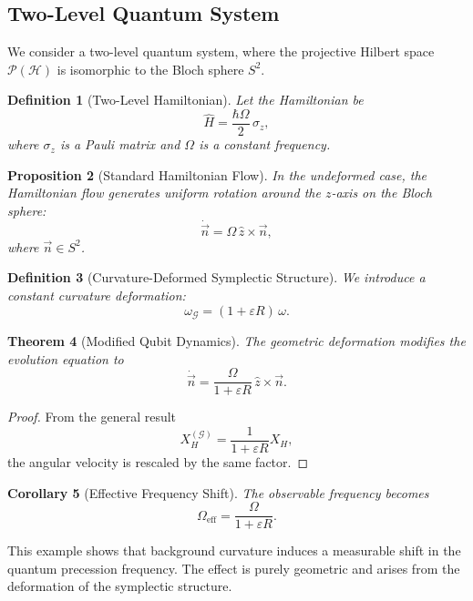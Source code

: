 \documentclass[11pt, a4paper]{article}
\newtheorem{theorem}{Theorem}[section]
\newtheorem{proposition}[theorem]{Proposition}
\newtheorem{definition}[theorem]{Definition}
\newtheorem{corollary}[theorem]{Corollary}
\begin{document}
\subsection{Two-Level Quantum System}

We consider a two-level quantum system, where the projective Hilbert space
$\mathcal{P}(\mathcal{H})$ is isomorphic to the Bloch sphere $S^2$.

\begin{definition}[Two-Level Hamiltonian]
Let the Hamiltonian be
\[
\hat{H} = \frac{\hbar \Omega}{2}\,\sigma_z,
\]
where $\sigma_z$ is a Pauli matrix and $\Omega$ is a constant frequency.
\end{definition}

\begin{proposition}[Standard Hamiltonian Flow]
In the undeformed case, the Hamiltonian flow generates uniform rotation
around the $z$-axis on the Bloch sphere:
\[
\dot{\vec{n}} = \Omega\, \hat{z} \times \vec{n},
\]
where $\vec{n} \in S^2$.
\end{proposition}

\begin{definition}[Curvature-Deformed Symplectic Structure]
We introduce a constant curvature deformation:
\[
\omega_{\mathcal{G}} = (1+\varepsilon R)\,\omega.
\]
\end{definition}

\begin{theorem}[Modified Qubit Dynamics]
The geometric deformation modifies the evolution equation to
\[
\dot{\vec{n}} = \frac{\Omega}{1+\varepsilon R}\, \hat{z} \times \vec{n}.
\]
\end{theorem}

\begin{proof}
From the general result
\[
X_H^{(\mathcal{G})} = \frac{1}{1+\varepsilon R} X_H,
\]
the angular velocity is rescaled by the same factor.
\end{proof}

\begin{corollary}[Effective Frequency Shift]
The observable frequency becomes
\[
\Omega_{\mathrm{eff}} = \frac{\Omega}{1+\varepsilon R}.
\]
\end{corollary}

This example shows that background curvature induces a measurable shift
in the quantum precession frequency. The effect is purely geometric and
arises from the deformation of the symplectic structure.
\end{document}

